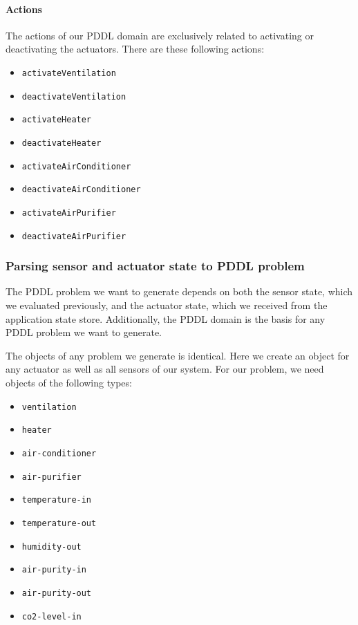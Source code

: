 \paragraph{Actions}
The actions of our PDDL domain are exclusively related to activating or deactivating the actuators.
There are these following actions:
\begin{itemize}
    \item \texttt{activateVentilation}
    \item \texttt{deactivateVentilation}
    \item \texttt{activateHeater}
    \item \texttt{deactivateHeater}
    \item \texttt{activateAirConditioner}
    \item \texttt{deactivateAirConditioner}
    \item \texttt{activateAirPurifier}
    \item \texttt{deactivateAirPurifier}
\end{itemize}

\subsubsection{Parsing sensor and actuator state to PDDL problem}\label{subsubsec:parsing-sensor-and-actuator-state-to-pddl-problem}
The PDDL problem we want to generate depends on both the sensor state, which we evaluated previously, and the actuator state, which we received from the application state store.
Additionally, the PDDL domain is the basis for any PDDL problem we want to generate.

The objects of any problem we generate is identical.
Here we create an object for any actuator as well as all sensors of our system.
For our problem, we need objects of the following types:
\begin{itemize}
    \item \texttt{ventilation}
    \item \texttt{heater}
    \item \texttt{air-conditioner}
    \item \texttt{air-purifier}
    \item \texttt{temperature-in}
    \item \texttt{temperature-out}
    \item \texttt{humidity-out}
    \item \texttt{air-purity-in}
    \item \texttt{air-purity-out}
    \item \texttt{co2-level-in}
\end{itemize}

